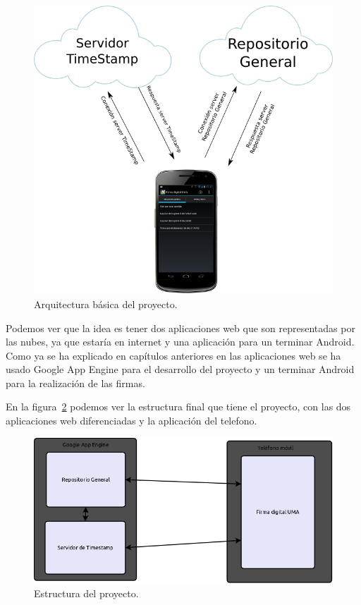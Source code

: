 \begin{figure}
  \centering
    \includegraphics[scale=0.5]{./DisenhoYArquitectura/imagenes/arquitecturaBasica.png}
  \caption{Arquitectura básica del proyecto.}
  \label{fig:arquitecturaBasica}
\end{figure}

Podemos ver que la idea es tener dos aplicaciones web que son representadas por las nubes, ya que estaría en internet y una aplicación para un terminar Android. Como ya se ha explicado en capítulos anteriores en las aplicaciones web se ha usado Google App Engine para el desarrollo del proyecto y un terminar Android para la realización de las firmas. 

En la figura~\ref{fig:estructura} podemos ver la estructura final que tiene el proyecto, con las dos aplicaciones web diferenciadas y la aplicación del telefono.

\begin{figure}
  \centering
    \includegraphics[scale=0.3]{./DisenhoYArquitectura/imagenes/estructura.png}
  \caption{Estructura del proyecto.}
  \label{fig:estructura}
\end{figure}

